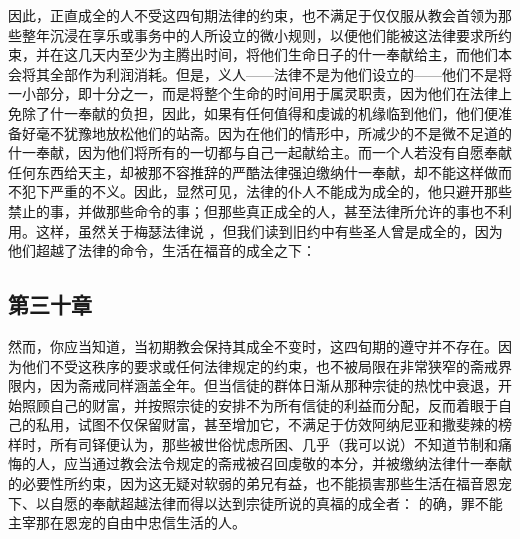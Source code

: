 因此，正直成全的人不受这四旬期法律的约束，也不满足于仅仅服从教会首领为那些整年沉浸在享乐或事务中的人所设立的微小规则，以便他们能被这法律要求所约束，并在这几天内至少为主腾出时间，将他们生命日子的什一奉献给主，而他们本会将其全部作为利润消耗。但是，义人——法律不是为他们设立的——他们不是将一小部分，即十分之一，而是将整个生命的时间用于属灵职责，因为他们在法律上免除了什一奉献的负担，因此，如果有任何值得和虔诚的机缘临到他们，他们便准备好毫不犹豫地放松他们的站斋。因为在他们的情形中，所减少的不是微不足道的什一奉献，因为他们将所有的一切都与自己一起献给主。而一个人若没有自愿奉献任何东西给天主，却被那不容推辞的严酷法律强迫缴纳什一奉献，却不能这样做而不犯下严重的不义。因此，显然可见，法律的仆人不能成为成全的，他只避开那些禁止的事，并做那些命令的事；但那些真正成全的人，甚至法律所允许的事也不利用。这样，虽然关于梅瑟法律说 ，但我们读到旧约中有些圣人曾是成全的，因为他们超越了法律的命令，生活在福音的成全之下： \par


\subsection{第三十章}

\par

然而，你应当知道，当初期教会保持其成全不变时，这四旬期的遵守并不存在。因为他们不受这秩序的要求或任何法律规定的约束，也不被局限在非常狭窄的斋戒界限内，因为斋戒同样涵盖全年。但当信徒的群体日渐从那种宗徒的热忱中衰退，开始照顾自己的财富，并按照宗徒的安排不为所有信徒的利益而分配，反而着眼于自己的私用，试图不仅保留财富，甚至增加它，不满足于仿效阿纳尼亚和撒斐辣的榜样时，所有司铎便认为，那些被世俗忧虑所困、几乎（我可以说）不知道节制和痛悔的人，应当通过教会法令规定的斋戒被召回虔敬的本分，并被缴纳法律什一奉献的必要性所约束，因为这无疑对软弱的弟兄有益，也不能损害那些生活在福音恩宠下、以自愿的奉献超越法律而得以达到宗徒所说的真福的成全者：  的确，罪不能主宰那在恩宠的自由中忠信生活的人。\par


